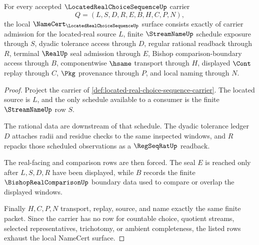 \begin{theorem}
\label{thm:located-real-choice-sequence-namecert-obligations}
For every accepted $\LocatedRealChoiceSequenceUp$ carrier
$$
Q=(L,S,D,R,E,B,H,C,P,N),
$$
the local $\NameCert_{\LocatedRealChoiceSequenceUp}$ surface consists exactly of carrier admission for the located-real source $L$, finite $\StreamNameUp$ schedule exposure through $S$, dyadic tolerance access through $D$, regular rational readback through $R$, terminal $\RealUp$ seal admission through $E$, Bishop comparison-boundary access through $B$, componentwise $\hsame$ transport through $H$, displayed $\Cont$ replay through $C$, $\Pkg$ provenance through $P$, and local naming through $N$.
\end{theorem}
\begin{proof}
Project the carrier of \autoref{def:located-real-choice-sequence-carrier}. The located source is $L$, and the only schedule available to a consumer is the finite $\StreamNameUp$ row $S$.

The rational data are downstream of that schedule. The dyadic tolerance ledger $D$ attaches radii and residue checks to the same inspected windows, and $R$ repacks those scheduled observations as a $\RegSeqRatUp$ readback.

The real-facing and comparison rows are then forced. The seal $E$ is reached only after $L,S,D,R$ have been displayed, while $B$ records the finite $\BishopRealComparisonUp$ boundary data used to compare or overlap the displayed windows.

Finally $H,C,P,N$ transport, replay, source, and name exactly the same finite packet. Since the carrier has no row for countable choice, quotient streams, selected representatives, trichotomy, or ambient completeness, the listed rows exhaust the local NameCert surface.
\end{proof}

